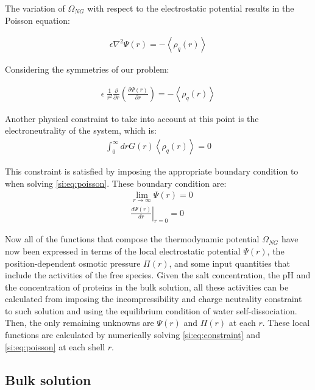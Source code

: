 \documentclass[journal=jacsat,manuscript=suppinfo]{achemso}
\begin{document}
	The variation of $\Omega_{NG}$ with respect to the electrostatic potential results in the Poisson equation:
	
	\begin{align}
		\epsilon\nabla^2\Psi(r) = -\left<\rho_q(r)\right>
	\end{align}
	
	Considering the symmetries of our problem:
	
	\begin{align}
		\epsilon ~ \frac{1}{r^2} \frac{\partial}{\partial r}\left(\frac{\partial \Psi(r)}{\partial r}\right) = -\left<\rho_q(r)\right>
		\label{si:eq:poisson}
	\end{align}
	
	Another physical constraint to take into account at this point is the electroneutrality of the system, which is:
	\begin{align}
		\int_0^\infty{drG(r) \left<\rho_q(r)\right>} = 0
	\end{align}
	
	This constraint is satisfied by imposing  the appropriate boundary condition to when solving \cref{si:eq:poisson}. 
	These boundary condition are:
	\begin{align}
		&  \lim_{r\to\infty}\Psi(r) = 0 \\
		&  \left.\frac{d\Psi(r)}{dr}\right|_{r=0} = 0
		\label{eq:si:contorno}
\end{align}


Now all of the functions that compose the thermodynamic potential $\Omega_{NG}$ have now been expressed in terms of the local electrostatic potential $\Psi(r)$, the position-dependent osmotic pressure $\Pi(r)$, and some input quantities that include the activities of the free species.
Given the salt concentration, the pH and the concentration of proteins in the bulk solution, all these activities can be calculated from imposing the incompressibility and charge neutrality constraint to such solution and using the equilibrium condition of water self-dissociation. 
Then, the only remaining unknowns are  $\Psi(r)$  and  $\Pi(r)$ at each $r$.
These local functions are calculated by numerically solving \cref{si:eq:constraint} and \cref{si:eq:poisson}  at each shell $r$.



\subsection{Bulk solution}
\end{document}
